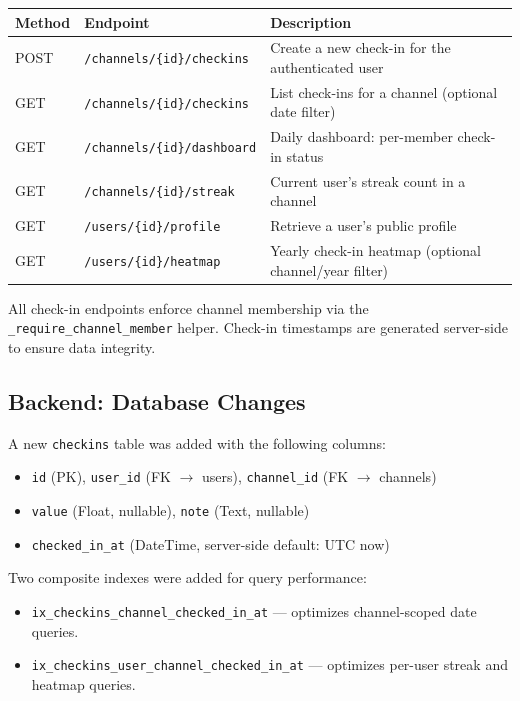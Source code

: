 \documentclass[11pt]{article}
\begin{document}
\begin{center}
\begin{tabularx}{\textwidth}{@{}llX@{}}
\toprule
\textbf{Method} & \textbf{Endpoint} & \textbf{Description} \\
\midrule
POST & \texttt{/channels/\{id\}/checkins} & Create a new check-in for the authenticated user \\
GET  & \texttt{/channels/\{id\}/checkins} & List check-ins for a channel (optional date filter) \\
GET  & \texttt{/channels/\{id\}/dashboard} & Daily dashboard: per-member check-in status \\
GET  & \texttt{/channels/\{id\}/streak} & Current user's streak count in a channel \\
GET  & \texttt{/users/\{id\}/profile} & Retrieve a user's public profile \\
GET  & \texttt{/users/\{id\}/heatmap} & Yearly check-in heatmap (optional channel/year filter) \\
\bottomrule
\end{tabularx}
\end{center}

All check-in endpoints enforce channel membership via the \texttt{\_require\_channel\_member} helper. Check-in timestamps are generated server-side to ensure data integrity.

\subsection{Backend: Database Changes}

A new \texttt{checkins} table was added with the following columns:

\begin{itemize}[leftmargin=1.5em]
    \item \texttt{id} (PK), \texttt{user\_id} (FK $\rightarrow$ users), \texttt{channel\_id} (FK $\rightarrow$ channels)
    \item \texttt{value} (Float, nullable), \texttt{note} (Text, nullable)
    \item \texttt{checked\_in\_at} (DateTime, server-side default: UTC now)
\end{itemize}

Two composite indexes were added for query performance:
\begin{itemize}[leftmargin=1.5em]
    \item \texttt{ix\_checkins\_channel\_checked\_in\_at} --- optimizes channel-scoped date queries.
    \item \texttt{ix\_checkins\_user\_channel\_checked\_in\_at} --- optimizes per-user streak and heatmap queries.
\end{itemize}
\end{document}
